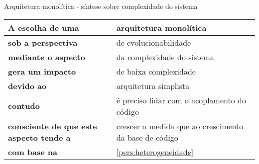 \begin{quadro}
    \caption{Arquitetura monolítica - síntese sobre complexidade do sistema\label{monolitico:sintese-complexidade}}
    \begin{tabularx}{\linewidth}{ | p{5cm} | X | }
    \hline
    \textbf{A escolha de uma}       & arquitetura monolítica \\ \hline
    \textbf{sob a perspectiva}      & de evolucionabilidade \\ \hline
    \textbf{mediante o aspecto}     & da complexidade do sistema \\ \hline
    \textbf{gera um impacto}        & de baixa complexidade \\ \hline
    \textbf{devido ao}              & arquitetura simplista \\ \hline
    \textbf{contudo}                & é preciso lidar com o acoplamento do código \\ \hline
    \textbf{consciente de que este aspecto tende a} & crescer a medida que ao crescimento da base de código\\ \hline
    \textbf{com base na}            & \autoref{pers:heterogeneidade} \\ \hline
    \end{tabularx}
\end{quadro}







